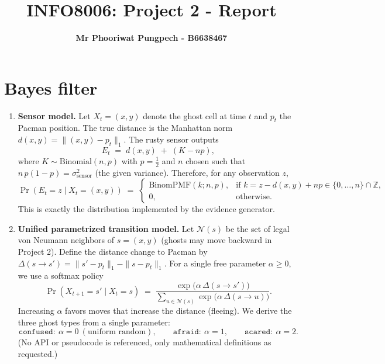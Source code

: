 \documentclass{article}
\begin{document}

\title{\Large{INFO8006: Project 2 - Report}}
\vspace{1cm}
\author{\small{\bf Mr Phooriwat Pungpech - B6638467}}

\maketitle


\section{Bayes filter}  

\begin{enumerate}[label=\alph*.,leftmargin=*]
    \item \textbf{Sensor model.}
    Let $X_t=(x,y)$ denote the ghost cell at time $t$ and $p_t$ the Pacman position.
    The true distance is the Manhattan norm $d(x,y)=\| (x,y)-p_t \|_1$.
    The rusty sensor outputs
    \[
      E_t \;=\; d(x,y) \;+\; (K - n p),
    \]
    where $K \sim \mathrm{Binomial}(n,p)$ with $p=\tfrac{1}{2}$ and $n$ chosen such that $n\,p(1-p)=\sigma^2_{\text{sensor}}$ (the given variance).
    Therefore, for any observation $z$,
    \[
      \Pr(E_t=z \mid X_t=(x,y))
      \;=\;
      \begin{cases}
        \mathrm{BinomPMF}(k;n,p), & \text{if } k=z-d(x,y)+np \in \{0,\dots,n\}\cap\mathbb{Z},\\[1mm]
        0, & \text{otherwise.}
      \end{cases}
    \]
    This is exactly the distribution implemented by the evidence generator.
    \item \textbf{Unified parametrized transition model.}
    Let $\mathcal{N}(s)$ be the set of legal von Neumann neighbors of $s=(x,y)$ (ghosts may move backward in Project 2).
    Define the distance change to Pacman by $\Delta(s\!\to\! s')=\|s'-p_t\|_1-\|s-p_t\|_1$.
    For a single free parameter $\alpha\ge 0$, we use a softmax policy
    \[
      \Pr(X_{t+1}=s' \mid X_t=s)
      \;=\;
      \frac{\exp\!\big(\alpha\,\Delta(s\!\to\! s')\big)}{\sum_{u\in\mathcal{N}(s)} \exp\!\big(\alpha\,\Delta(s\!\to\! u)\big)}.
    \]
    Increasing $\alpha$ favors moves that increase the distance (fleeing).
    We derive the three ghost types from a single parameter:
    \[
      \texttt{confused}:~\alpha=0 \ (\text{uniform random}),\qquad
      \texttt{afraid}:~\alpha=1,\qquad
      \texttt{scared}:~\alpha=2.
    \]
    (No API or pseudocode is referenced, only mathematical definitions as requested.)

\end{enumerate}
\end{document}
